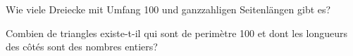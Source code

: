 Wie viele Dreiecke mit Umfang 100 und ganzzahligen Seitenlängen gibt es?

\bigskip

Combien de triangles existe-t-il qui sont de perimètre 100 et dont les longueurs des côtés sont des nombres entiers?